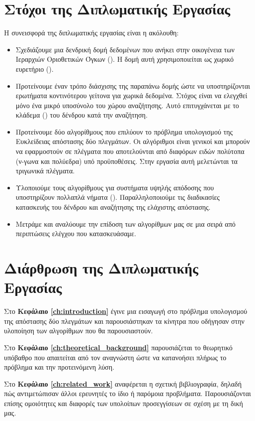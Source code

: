 \section{Στόχοι της Διπλωματικής Εργασίας}
Η συνεισφορά της διπλωματικής εργασίας είναι η ακόλουθη:
\begin{itemize}
    \item Σχεδιάζουμε μια δενδρική δομή δεδομένων που ανήκει στην 
    οικογένεια των Ιεραρχιών Οριοθετικών Όγκων (). Η δομή 
    αυτή χρησιμοποιείται ως χωρικό ευρετήριο ().
    \item Προτείνουμε έναν τρόπο διάσχισης της παραπάνω δομής ώστε 
    να υποστηρίζονται ερωτήματα κοντινότερου γείτονα για χωρικά 
    δεδομένα. Στόχος είναι να ελεγχθεί μόνο ένα μικρό υποσύνολο του 
    χώρου αναζήτησης. Αυτό επιτυγχάνεται με το κλάδεμα ()
    του δένδρου κατά την αναζήτηση.
    \item Προτείνουμε δύο αλγορίθμους που επιλύουν το πρόβλημα 
    υπολογισμού της Ευκλείδειας απόστασης δύο πλεγμάτων. 
    Οι αλγόριθμοι είναι γενικοί και μπορούν να εφαρμοστούν σε 
    πλέγματα που αποτελούνται από διαφόρων ειδών πολύτοπα (ν-γωνα και 
    πολύεδρα) υπό προϋποθέσεις. Στην εργασία αυτή μελετώνται τα 
    τριγωνικά πλέγματα.
    \item Υλοποιούμε τους αλγορίθμους για συστήματα υψηλής απόδοσης 
    που υποστηρίζουν πολλαπλά νήματα (). 
    Παραλληλοποιούμε τις διαδικασίες κατασκευής του δένδρου και
    αναζήτησης της ελάχιστης απόστασης.
    \item Μετράμε και αναλύουμε την επίδοση των αλγορίθμων μας 
    σε μια σειρά από περιπτώσεις ελέγχου που κατασκευάσαμε. 
\end{itemize}

\section{Διάρθρωση της Διπλωματικής Εργασίας}
Στο \textbf{Κεφάλαιο \ref{ch:introduction}} έγινε μια εισαγωγή στο 
πρόβλημα υπολογισμού της απόστασης δύο πλεγμάτων και παρουσιάστηκαν
τα κίνητρα που οδήγησαν στην υλοποίηση των αλγορίθμων που θα 
παρουσιαστούν. 

Στο \textbf{Κεφάλαιο \ref{ch:theoretical_background}} παρουσιάζεται το 
θεωρητικό υπόβαθρο που απαιτείται από τον αναγνώστη ώστε να κατανοήσει
πλήρως το πρόβλημα και την προτεινόμενη λύση.

Στο \textbf{Κεφάλαιο \ref{ch:related_work}} αναφέρεται η σχετική 
βιβλιογραφία, δηλαδή πώς αντιμετώπισαν άλλοι ερευνητές το ίδιο ή 
παρόμοια προβλήματα. 
Παρουσιάζονται επίσης ομοιότητες και διαφορές
των υπολοίπων προσεγγίσεων σε σχέση με τη δική μας.

